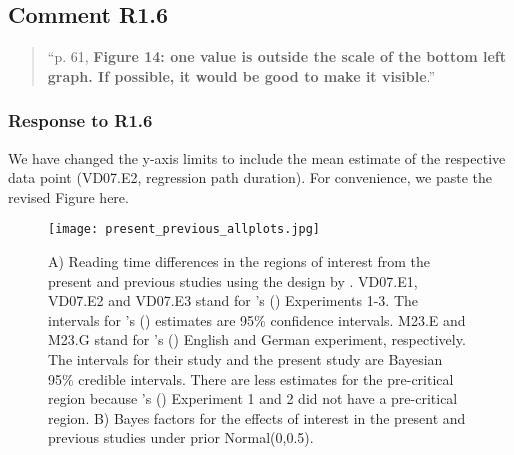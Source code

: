 \documentclass[12pt]{article}
\begin{document}
\begin{quote}
\end{quote}

\subsection*{Comment R1.6}

\begin{quote}
``p. 61, \textbf{Figure 14: one value is outside the scale of the bottom left graph. If possible, it would be good to make it visible}.''
\end{quote}

\subsubsection*{Response to R1.6}
We have changed the y-axis limits to include the mean estimate of the respective data point (VD07.E2, regression path duration). For convenience, we paste the revised Figure here.

\setcounter{figure}{13}
\begin{sidewaysfigure}[htpb]
    \caption{A) Reading time differences in the regions of interest from the present and previous studies using the design by \cite{vandyke07}. VD07.E1, VD07.E2 and VD07.E3 stand for \citeauthor{vandyke07}'s (\citeyear{vandyke07}) Experiments 1-3. The intervals for \citeauthor{vandyke07}'s (\citeyear{vandyke07}) estimates are 95\% confidence intervals. M23.E and M23.G stand for \citeauthor{mertzen}'s (\citeyear{mertzen}) English and German experiment, respectively. The intervals for their study and the present study are Bayesian 95\% credible intervals. There are less estimates for the pre-critical region because \citeauthor{vandyke07}'s (\citeyear{vandyke07}) Experiment 1 and 2 did not have a pre-critical region. B) Bayes factors for the effects of interest in the present and previous studies under prior Normal(0,0.5).}
    \label{fig:previous_vs_present}
    \centering
    \texttt{[image: present\_previous\_allplots.jpg]}
\end{sidewaysfigure}
\clearpage
\end{document}
